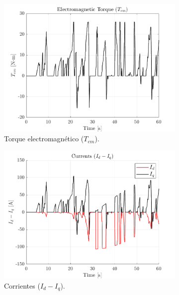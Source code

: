 \begin{figure}[!htb]
    \centering
    \begin{subfigure}{0.4\textwidth}
        \includegraphics[width=\linewidth]{fig/Tem_plot.png}
        \caption{Torque electromagnético ($T_{em}$).}
    \end{subfigure}
    \begin{subfigure}{0.4\textwidth}
        \includegraphics[width=\linewidth]{fig/idiq_plot.png}
        \caption{Corrientes ($I_{d} - I_{q}$).}
    \end{subfigure}
    \begin{subfigure}{0.4\textwidth}

\end{subfigure}
\end{figure}
